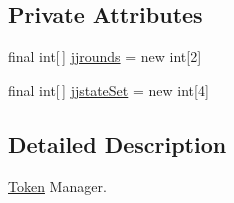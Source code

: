 \subsection*{Private Attributes}
\begin{DoxyCompactItemize}
\item 
final int\mbox{[}$\,$\mbox{]} \hyperlink{classorg_1_1coode_1_1owl_1_1krssparser_1_1_k_r_s_s_parser_token_manager_a948c4e47aeddc768faba0733d39b4f03}{jjrounds} = new int\mbox{[}2\mbox{]}
\item 
final int\mbox{[}$\,$\mbox{]} \hyperlink{classorg_1_1coode_1_1owl_1_1krssparser_1_1_k_r_s_s_parser_token_manager_a79af212ab84c4a78d4f595883594cfa0}{jjstate\-Set} = new int\mbox{[}4\mbox{]}
\end{DoxyCompactItemize}


\subsection{Detailed Description}
\hyperlink{classorg_1_1coode_1_1owl_1_1krssparser_1_1_token}{Token} Manager. 

